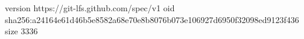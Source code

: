 version https://git-lfs.github.com/spec/v1
oid sha256:a24164e61d46b5e8582a68e70e8b8076b073e106927d6950f32098ed9123f436
size 3336
